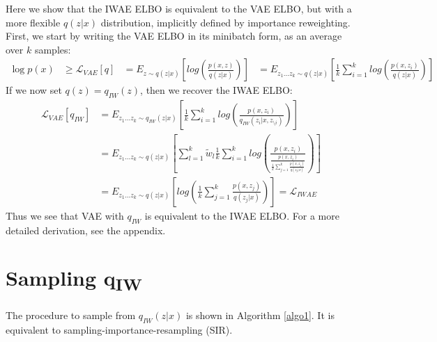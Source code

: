 \documentclass{article} %
\begin{document}
Here we show that the IWAE ELBO is equivalent to the VAE ELBO, but with a more flexible $q(z|x)$ distribution, implicitly defined by importance reweighting.
First, we start by writing the VAE ELBO in its minibatch form, as an average over $k$ samples:
\begin{align} 
    \log p(x) &\geq 
    \mathcal{L}_{VAE}[q] &=
    E_{z \sim q(z|x)} \left[  log\left(\frac{p(x,z)}{q(z|x)} \right) \right]  
    &= E_{z_{1}...z_{k} \sim q(z|x)} \left[  \frac{1}{k}\sum_{i=1}^k log\left(\frac{p(x,z_i)}{q(z|x)} \right) \right]
\end{align}
If we now set $q(z) = q_{IW}(z)$, then we recover the IWAE ELBO:
\begin{align}
        \mathcal{L}_{VAE}[q_{IW}]
        &= E_{z_{1}...z_{k} \sim q_{IW}(z|x)} \left[  \frac{1}{k}\sum_{i=1}^k log\left(\frac{p(x,z_i)}{q_{IW}(z_i|x,z_{\setminus i})}  \right)  \right] \\
    &= E_{z_{1}...z_{k} \sim q(z|x)} \left[ \sum_{l=1}^k \tilde w_l \frac{1}{k}\sum_{i=1}^k log\left(\frac{p(x,z_i)}{\frac{p(x,z_i)}{\frac{1}{k}   \sum_{j=1}^k \frac{p(x,z_j)}{q(z_j|x)}}}  \right)  \right] \\
    &= E_{z_{1}...z_{k} \sim q(z|x)} \left[  log\left(\frac{1}{k}\sum_{j=1}^k \frac{p(x,z_j)}{q(z_j|x)}  \right)  \right] = \mathcal{L}_{IWAE}
\end{align}
Thus we see that VAE with $q_{IW}$ is equivalent to the IWAE ELBO.  For a more detailed derivation, see the appendix.






\section{Sampling q\textsubscript{IW}}
The procedure to sample from $q_{IW}(z|x)$ is shown in Algorithm \ref{algo1}.
It is equivalent to sampling-importance-resampling (SIR). 
\end{document}
